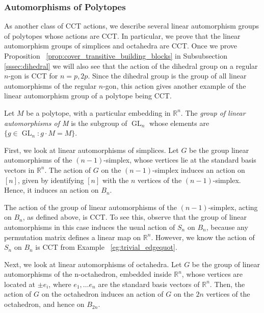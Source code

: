 \documentclass[smallextended, envcountsame, numbook]{svjour3}
\numberwithin{equation}{section}
\newcommand\sssec{\subsubsection}
\begin{document}
\sssec{Automorphisms of Polytopes}
\label{sssec:polytopes}

As another class of CCT actions, we describe several linear automorphism groups of polytopes whose actions are CCT. In particular, we prove that the linear automorphism groups of simplices and octahedra are CCT.
Once we prove Proposition ~\ref{prop:cover_transitive_building_blocks} in Subsubsection \ref{sssec:dihedral} we will also see that the action of the dihedral group on a regular $n$-gon is CCT for $n = p,2p$.  Since the dihedral group is the group of all linear automorphisms of the regular $n$-gon, this action gives another example of the linear automorphism group of a polytope being CCT.

\begin{definition}
Let $M$ be a polytope, with a particular embedding in $\mathbb R^n$. The {\it group of linear automorphisms of M} is the subgroup of $\operatorname{GL}_n$ whose elements are $\{g \in \operatorname{GL}_n\colon g \cdot M = M\}$.
\end{definition}

First, we look at linear automorphisms of simplices. Let $G$ be the group linear automorphisms of the $(n-1)$-simplex, whose vertices lie at the standard basis vectors in $\mathbb R^n$. The action of $G$ on the $(n-1)$-simplex induces an action on $[n]$, given by identifying $[n]$ with the $n$ vertices of the $(n-1)$-simplex. Hence, it induces an action on $B_n$.

\begin{example}
The action of the group of linear automorphisms of the $(n-1)$-simplex, acting on $B_n$, as defined above, is CCT. To see this, observe that the group of linear automorphisms in this case induces the usual action of $S_n$ on $B_n$, because any permutation matrix defines a linear map on $\mathbb R^n$. However, we know the action of $S_n$ on $B_n$ is CCT from Example ~\ref{eg:trivial_edgequot}.
\end{example}

Next, we look at linear automorphisms of octahedra. Let $G$ be the group of linear automorphisms of the n-octahedron, embedded inside $\mathbb R^n$, whose vertices are located at $\pm e_i$, where $e_1,\ldots e_n$ are the standard basis vectors of $\mathbb R^n$. Then, the action of $G$ on the octahedron induces an action of $G$ on the $2n$ vertices of the octahedron, and hence on $B_{2n}$.
\end{document}
